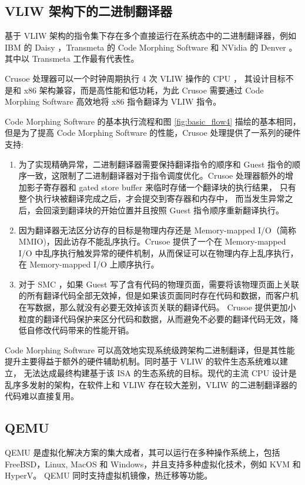 \subsection{VLIW 架构下的二进制翻译器}
基于 VLIW 架构的指令集下存在多个直接运行在系统态中的二进制翻译器，例如 IBM 的 Daisy \citep{ebciouglu1997daisy} ，Transmeta 的 Code Morphing Software \citep{klaiber2000technology} \citep{dehnert2003transmeta} 和 NVidia 的 Denver \citep{boggs2015denver}。
其中以 Transmeta 工作最有代表性。

Crusoe 处理器可以一个时钟周期执行 4 次 VLIW 操作的 CPU ，
其设计目标不是和 x86 架构兼容，而是高性能和低功耗，为此 Crusoe 需要通过 Code Morphing Software 高效地将 x86 指令翻译为 VLIW 指令。

Code Morphing Software 的基本执行流程和图 \ref{fig:basic_flow4} 描绘的基本相同，但是为了提高 Code Morphing Software 的性能，Crusoe 处理提供了一系列的硬件支持:
\begin{enumerate}
	\item 为了实现精确异常，二进制翻译器需要保持翻译指令的顺序和 Guest 指令的顺序一致，这限制了二进制翻译器对于指令调度优化。Crusoe 处理器额外的增加影子寄存器和 gated store buffer 来临时存储一个翻译块的执行结果，
	      只有整个执行块被翻译完成之后，才会提交到寄存器和内存中，
	      而当发生异常之后，会回滚到翻译块的开始位置并且按照 Guest 指令顺序重新翻译执行。
	\item 因为翻译器无法区分访存的目标是物理内存还是 Memory-mapped I/O（简称 MMIO)，因此访存不能乱序执行。Crusoe 提供了一个在 Memory-mapped I/O 中乱序执行触发异常的硬件机制，从而保证可以在物理内存上乱序执行，在 Memory-mapped I/O 上顺序执行。
	\item 对于 SMC ，如果 Guest 写了含有代码的物理页面，需要将该物理页面上关联的所有翻译代码全部无效掉，但是如果该页面同时存在代码和数据，而客户机在写数据，那么就没有必要无效掉该页关联的翻译代码。
	      Crusoe 提供更加小粒度的翻译代码保护来区分代码和数据，从而避免不必要的翻译代码无效，降低自修改代码带来的性能开销。
\end{enumerate}

Code Morphing Software 可以高效地实现系统级跨架构二进制翻译，但是其性能提升主要得益于额外的硬件辅助机制。同时基于 VLIW 的软件生态系统难以建立，
无法达成最终构建基于该 ISA 的生态系统的目标。现代的主流 CPU 设计是乱序多发射的架构，在软件上和 VLIW 存在较大差别，VLIW 的二进制翻译器的代码难以直接复用。

\subsection{QEMU}
QEMU \citep{bellard2005qemu} 是虚拟化解决方案的集大成者，其可以运行在多种操作系统上，包括 FreeBSD，Linux, MacOS 和 Windows，并且支持多种虚拟化技术，例如 KVM 和 HyperV。
QEMU 同时支持虚拟机镜像，热迁移等功能。

